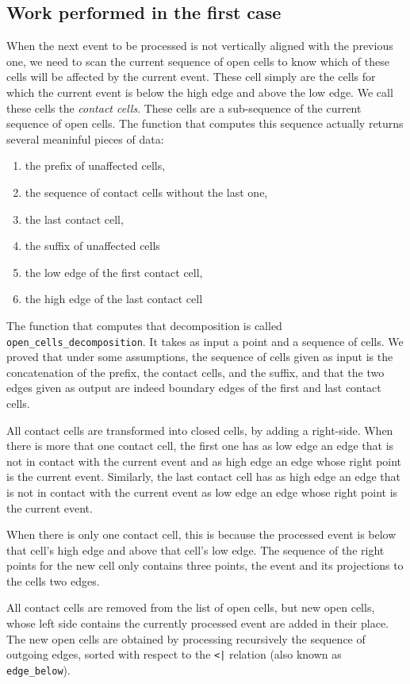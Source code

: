 \documentclass[a4paper, USenglish, cleveref, autoref, thm-restate]{lipics-v2021}
\begin{document}
\subsection{Work performed in the first case}
When the next event to be processed is not vertically aligned with the
previous one, we need to scan the current sequence of open cells to
know which of these cells will be affected by the current event.
These cell simply are the cells for which the current event is below
the high edge and above the low edge.  We call these cells the {\em
  contact cells}.  These cells are a sub-sequence
of the current sequence of open cells.  The function that computes
this sequence actually returns several meaninful pieces of data:
\begin{enumerate}
\item the prefix of unaffected cells,
\item the sequence of contact cells without the last one,
\item the last contact cell,
\item the suffix of unaffected cells
\item the low edge of the first contact cell,
\item the high edge of the last contact cell
\end{enumerate}
The function that computes that decomposition is called
{\tt open\_cells\_decomposition}.  It takes as input a point and a
sequence of cells.  We proved that under some assumptions, the
sequence of cells given as input is the concatenation of the prefix,
the contact cells, and the suffix, and that the two edges given as
output are indeed boundary edges of the first and last contact cells.

All contact cells are transformed into closed cells, by adding a
right-side.  When there is more that one contact cell, the first one
has as low edge an edge that is not in contact with the current event
and as high edge an edge whose right point is the current event.
Similarly, the last contact cell has as high edge an edge that is not
in contact with the current event as low edge an edge whose right
point is the current event.

When there is only one contact cell, this is because the processed
event is below that cell's high edge and above that cell's low edge.
The sequence of the right points for the new cell only contains three
points, the event and its projections to the cells two edges.

All contact cells are removed from the list of open cells, but new
open cells, whose left side contains the currently processed event are
added in their place.  The new open cells are obtained by processing
recursively the sequence of outgoing edges, sorted with respect to the 
{\tt <|} relation (also known as {\tt edge\_below}).
\end{document}
